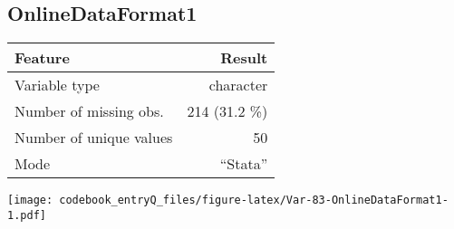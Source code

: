 \documentclass[]{article}
\newcommand{\fullline}{\noindent\makebox[\linewidth]{\rule{\textwidth}{0.4pt}}}
\newcommand{\bminione}{\begin{minipage}{0.75 \textwidth}}
\newcommand{\bminitwo}{\begin{minipage}{0.25 \textwidth}}
\newcommand{\emini}{\end{minipage}}
\begin{document}
\fullline

\hypertarget{onlinedataformat1}{\subsection{OnlineDataFormat1}\label{onlinedataformat1}}

\bminione

\begin{longtable}[]{@{}lr@{}}
\toprule
\begin{minipage}[b]{0.34\columnwidth}\raggedright\strut
Feature\strut
\end{minipage} & \begin{minipage}[b]{0.18\columnwidth}\raggedleft\strut
Result\strut
\end{minipage}\tabularnewline
\midrule
\endhead
\begin{minipage}[t]{0.34\columnwidth}\raggedright\strut
Variable type\strut
\end{minipage} & \begin{minipage}[t]{0.18\columnwidth}\raggedleft\strut
character\strut
\end{minipage}\tabularnewline
\begin{minipage}[t]{0.34\columnwidth}\raggedright\strut
Number of missing obs.\strut
\end{minipage} & \begin{minipage}[t]{0.18\columnwidth}\raggedleft\strut
214 (31.2 \%)\strut
\end{minipage}\tabularnewline
\begin{minipage}[t]{0.34\columnwidth}\raggedright\strut
Number of unique values\strut
\end{minipage} & \begin{minipage}[t]{0.18\columnwidth}\raggedleft\strut
50\strut
\end{minipage}\tabularnewline
\begin{minipage}[t]{0.34\columnwidth}\raggedright\strut
Mode\strut
\end{minipage} & \begin{minipage}[t]{0.18\columnwidth}\raggedleft\strut
``Stata''\strut
\end{minipage}\tabularnewline
\bottomrule
\end{longtable}

\emini
\bminitwo
\texttt{[image: codebook\_entryQ\_files/figure-latex/Var-83-OnlineDataFormat1-1.pdf]}
\emini
\end{document}
